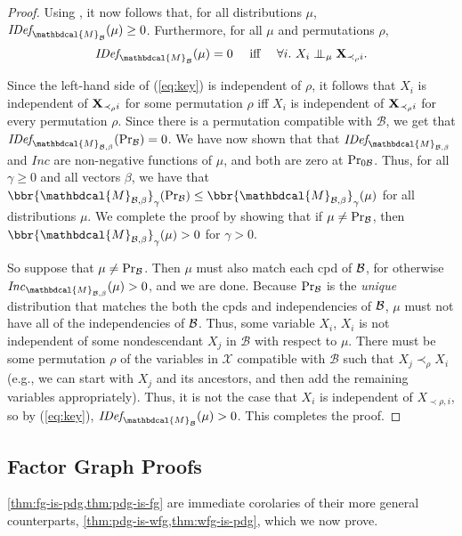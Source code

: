 \documentclass[letterpaper]{article} %
\theoremstyle{plain}
\theoremstyle{definition}
\theoremstyle{remark}
\newcommand{\CI}{\mathrel{\perp\mspace{-10mu}\perp}} %
\newcommand{\dg}[1]{\mathbdcal{#1}}
\newcommand{\IDef}[1]{\mathit{IDef}_{\!#1}}
\newcommand\Inc{\mathit{Inc}}
\newcommand{\PDGof}[1]{{\dg M}_{#1}}
\begin{document}
\begin{proof}
Using , it now follows that,
for all distributions $\mu$,
$\IDef{\PDGof{\mathcal B}}(\mu) \ge 0$.
Furthermore, for all $\mu$ and permutations $\rho$,
\begin{equation}\label{eq:key}
  \IDef{\PDGof{\mathcal B}}(\mu) = 0 \quad\mbox{ iff }\quad 
    \forall i.~X_i \CI_\mu {\bf X}_{\prec_\rho i}.
\end{equation}

Since the left-hand side of (\ref{eq:key}) is independent of $\rho$,
it follows that $X_i$ is independent of 
${\bf X}_{\prec_\rho i}$ for some permutation $\rho$ iff $X_i$ is independent of
  ${\bf X}_{\prec_\rho i}$ for every permutation $\rho$.  Since there
is a permutation compatible with $\mathcal B$, we get that 
$\IDef{\PDGof{\mathcal B,\beta}}(\Pr_{\cal B}) = 0$.
We have now shown that that $\IDef{\PDGof{\mathcal B, \beta}}$ and $\Inc$ are 
non-negative functions of $\mu$, and both are zero at $\Pr_{0\cal B}$. 
Thus, for all $\gamma \geq 0$ and all vectors $\beta$, we
have that   $\bbr{\PDGof{\mathcal B, \beta}}_\gamma( \Pr_{\cal
  B}) \le \bbr{\PDGof{\mathcal B, \beta}}_\gamma( \mu)$ for all
distributions $\mu$.  We complete the proof by showing that if
$\mu \ne \Pr_{\cal B}$, then 
$\bbr{\PDGof{\mathcal B, \beta}}_\gamma(\mu) > 0$
for $\gamma > 0$.

So suppose that $\mu \ne \Pr_{\cal B}$. 
Then $\mu$ must also match each cpd of $\cal B$,
for otherwise $\Inc_{\PDGof{\mathcal B,
\beta}}(\mu) > 0$, and we are done.  
Because $\Pr_{\cal B}$ is the \emph{unique} distribution that matches the 
both the cpds and independencies of $\cal B$, $\mu$ must not have all of the 
independencies of $\cal B$. 
Thus,
some variable $X_i$, $X_i$ is not independent of some nondescendant $X_j$ in
$\mathcal B$ with respect to $\mu$.  There must be some permutation
$\rho$ of the variables in $\mathcal X$ compatible with ${\mathcal B}$
such that $X_j \prec_{\rho} X_i$ (e.g., we can start with $X_j$ and
its ancestors, and then add the remaining variables appropriately).
Thus, it is not the case that $X_i$ is independent of $X_{\prec \rho,
  i}$, so by (\ref{eq:key}), $\IDef{\PDGof{\mathcal B}}(\mu) > 0$.
This completes the proof.
\end{proof}

\subsection{Factor Graph Proofs}
\cref{thm:fg-is-pdg,thm:pdg-is-fg} are immediate corolaries of their
more general counterparts, \cref{thm:pdg-is-wfg,thm:wfg-is-pdg}, which
we now prove. 
\end{document}
